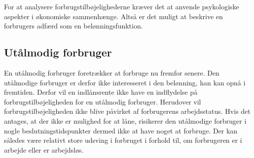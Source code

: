 
For at analysere forbrugstilbøjelighederne kræver det at anvende psykologiske aspekter i økonomiske sammenhænge. Altså er det muligt at beskrive en forbrugers adfærd som en belønningsfunktion. 



\subsection{Utålmodig forbruger}
En utålmodig forbruger foretrækker at forbruge nu fremfor senere. Den utålmodige forbruger er derfor ikke interesseret i den belønning, han kan opnå i fremtiden. Derfor vil en indlånsrente ikke have en indflydelse på forbrugstilbøjeligheden for en utålmodig forbruger. Herudover vil forbrugstilbøjeligheden ikke blive påvirket af forbrugerens arbejdsstatus. Hvis det antages, at der ikke er mulighed for at låne, risikerer den utålmodige forbruger i nogle beslutningstidspunkter dermed ikke at have noget at forbruge. Der kan således være relativt store udsving i forbruget i forhold til, om forbrugeren er i arbejde eller er arbejdsløs. 






